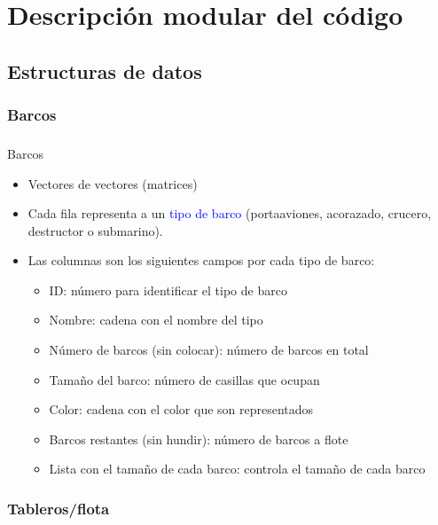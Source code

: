 \section{Descripción modular del código}

\subsection{Estructuras de datos}

\subsubsection{Barcos}

\begin{frame}
    \frametitle{\insertsection}
    \framesubtitle{\hskip30pt \insertsubsection}

    \begin{block}{Barcos}
        \begin{itemize}
            \item Vectores de vectores (matrices)
            \item Cada fila representa a un \textcolor{blue}{tipo de barco} (portaaviones, acorazado, crucero, destructor o submarino).
            \item Las columnas son los siguientes campos por cada tipo de barco:
            \begin{itemize}
                \item ID: número para identificar el tipo de barco
                \item Nombre: cadena con el nombre del tipo
                \item Número de barcos (sin colocar): número de barcos en total
                \item Tamaño del barco: número de casillas que ocupan
                \item Color: cadena con el color que son representados
                \item Barcos restantes (sin hundir): número de barcos a flote
                \item Lista con el tamaño de cada barco: controla el tamaño de cada barco
            \end{itemize}
        \end{itemize}
    \end{block}
\end{frame}


\subsubsection{Tableros/flota}

